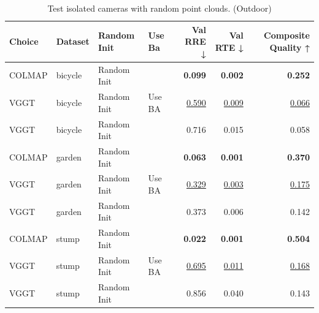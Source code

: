 \begin{table}[H]
\caption{\ifdefined\customcaption \customcaption \else Test isolated cameras with random point clouds. (Outdoor) \fi}
\label{tab:06_isolated_cams_outdoor}
\centering
\scriptsize
\begin{tabular}{llllrrr}
\toprule
Choice & Dataset & Random Init & Use Ba & Val RRE ↓ & Val RTE ↓ & Composite Quality ↑ \\
\midrule
COLMAP & bicycle & Random Init &  & \textbf{0.099} & \textbf{0.002} & \textbf{0.252} \\
VGGT & bicycle & Random Init & Use BA & \underline{0.590} & \underline{0.009} & \underline{0.066} \\
VGGT & bicycle & Random Init &  & 0.716 & 0.015 & 0.058 \\
\midrule
COLMAP & garden & Random Init &  & \textbf{0.063} & \textbf{0.001} & \textbf{0.370} \\
VGGT & garden & Random Init & Use BA & \underline{0.329} & \underline{0.003} & \underline{0.175} \\
VGGT & garden & Random Init &  & 0.373 & 0.006 & 0.142 \\
\midrule
COLMAP & stump & Random Init &  & \textbf{0.022} & \textbf{0.001} & \textbf{0.504} \\
VGGT & stump & Random Init & Use BA & \underline{0.695} & \underline{0.011} & \underline{0.168} \\
VGGT & stump & Random Init &  & 0.856 & 0.040 & 0.143 \\
\bottomrule
\end{tabular}
\end{table}